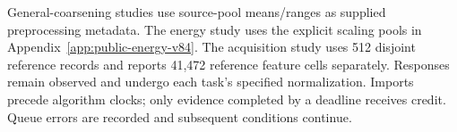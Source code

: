 General-coarsening studies use source-pool means/ranges as supplied preprocessing metadata. The energy study uses the explicit scaling pools in Appendix~\ref{app:public-energy-v84}. The acquisition study uses 512 disjoint reference records and reports 41,472 reference feature cells separately. Responses remain observed and undergo each task's specified normalization. Imports precede algorithm clocks; only evidence completed by a deadline receives credit. Queue errors are recorded and subsequent conditions continue.
